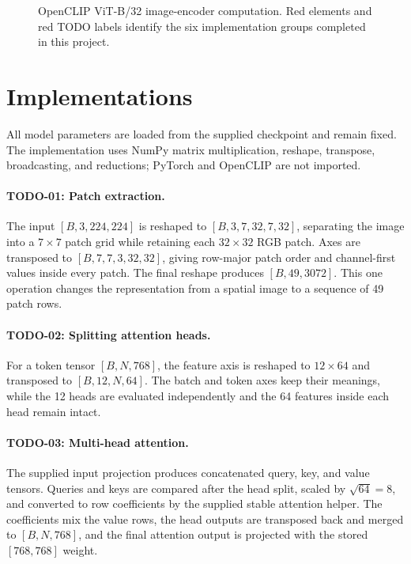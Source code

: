 \documentclass[a4paper,12pt]{article}
\begin{document}
\begin{figure}[H]
{
}
\caption{OpenCLIP ViT-B/32 image-encoder computation. Red elements and red
TODO labels identify the six implementation groups completed in this project.}
\label{fig:vit-arch}
\end{figure}

\section{Implementations}

All model parameters are loaded from the supplied checkpoint and remain fixed.
The implementation uses NumPy matrix multiplication, reshape, transpose,
broadcasting, and reductions; PyTorch and OpenCLIP are not imported.

\paragraph{TODO-01: Patch extraction.}
The input \([B,3,224,224]\) is reshaped to
\([B,3,7,32,7,32]\), separating the image into a \(7\times7\) patch grid while
retaining each \(32\times32\) RGB patch. Axes are transposed to
\([B,7,7,3,32,32]\), giving row-major patch order and channel-first values
inside every patch. The final reshape produces \([B,49,3072]\). This one
operation changes the representation from a spatial image to a sequence of 49
patch rows.

\paragraph{TODO-02: Splitting attention heads.}
For a token tensor \([B,N,768]\), the feature axis is reshaped to
\(12\times64\) and transposed to \([B,12,N,64]\). The batch and token axes keep
their meanings, while the 12 heads are evaluated independently and the 64
features inside each head remain intact.

\paragraph{TODO-03: Multi-head attention.}
The supplied input projection produces concatenated query, key, and value
tensors. Queries and keys are compared after the head split, scaled by
\(\sqrt{64}=8\), and converted to row coefficients by the supplied stable
attention helper. The coefficients mix the value rows, the head outputs are
transposed back and merged to \([B,N,768]\), and the final attention output is
projected with the stored \([768,768]\) weight.
\end{document}
